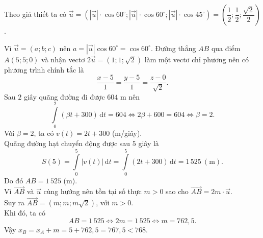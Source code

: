 \begin{ex}[TN2025-0101]
{\begin{center}
        \end{center}
        Theo giả thiết ta có $\overrightarrow{u}=\left(|\overrightarrow{u}|\cdot \cos 60^\circ; |\overrightarrow{u}|\cdot \cos 60^\circ; |\overrightarrow{u}|\cdot \cos 45^\circ\right)=\left(\dfrac{1}{2};\dfrac{1}{2};\dfrac{\sqrt{2}}{2}\right)$.
        \begin{itemchoice}
            \itemch Vì $\overrightarrow{u}=(a;b;c)$ nên $a=|\overrightarrow{u}|\cos 60^\circ=\cos 60^\circ$.
            \itemch Đường thẳng $AB$ qua điểm $A(5;5;0)$ và nhận vectơ $2\overrightarrow{u}=\left(1;1;\sqrt{2}\right)$ làm một vectơ chỉ phương nên có phương trình chính tắc là
            \[\dfrac{x-5}{1}=\dfrac{y-5}{1}=\dfrac{z-0}{\sqrt{2}}.\]
            \itemch Sau $2$ giây quãng đường đi được $604$ m nên
            $$\displaystyle \int\limits_0^2 (\beta t+300) \mathrm{\,d}t=604 \Leftrightarrow 2\beta+600=604\Leftrightarrow \beta=2.$$
            \itemch Với $\beta =2$, ta có $v(t)=2t+300$ (m/giây).\\
            Quãng đường hạt chuyển động được sau $5$ giây là 
            $$S(5)=\displaystyle \int\limits_0^5 |v(t)| \mathrm{\,d}t=\int\limits_0^5 (2t+300) \mathrm{\,d}t=1\,525 \ (\text{m}).$$
            Do đó $AB=1\,525$ (m).\\
            Vì $\overrightarrow{AB}$ và $\overrightarrow{u}$ cùng hướng nên tồn tại số thực $m>0$ sao cho $\overrightarrow{AB}=2m\cdot \overrightarrow{u}$.\\
            Suy ra $\overrightarrow{AB}=\left(m;m;m\sqrt{2}\right)$, với $m>0$.\\
            Khi đó, ta có
            $$AB=1\,525\Leftrightarrow 2m=1\,525\Leftrightarrow m=762{,}5.$$
            Vậy $ x_B=x_A+m=5+762{,}5=767{,}5<768$.
        \end{itemchoice}
    }
\end{ex}


